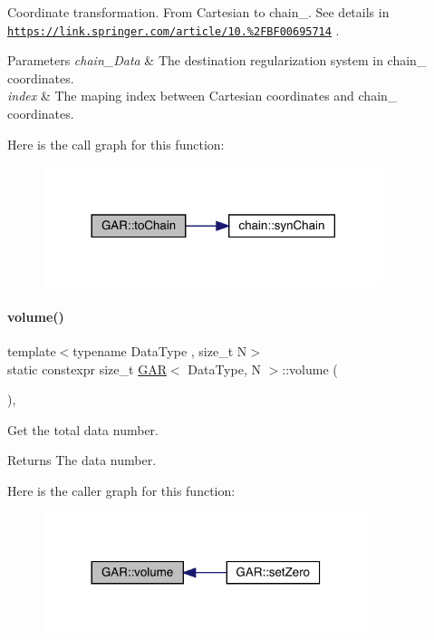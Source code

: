 Coordinate transformation. From Cartesian to chain_. See details in \href{https://link.springer.com/article/10.1007%2FBF00695714}{\tt https\+://link.\+springer.\+com/article/10.\%2\+F\+B\+F00695714} .
\begin{DoxyParams}{Parameters}
{\em chain_\+Data} & The destination regularization system in chain_ coordinates. \\
\hline
{\em index} & The maping index between Cartesian coordinates and chain_ coordinates. \\
\hline
\end{DoxyParams}
Here is the call graph for this function\+:\nopagebreak
\begin{figure}[H]
\begin{center}
\leavevmode
\includegraphics[width=281pt]{class_g_a_r_a18041ac48dc47e6ada3e8a33893b1200_cgraph}
\end{center}
\end{figure}
\mbox{\label{class_g_a_r_abdbcc31db058125bd2ee207e7648b20b}} 
\paragraph{\texorpdfstring{volume()}{volume()}}
{\footnotesize\ttfamily template$<$typename Data\+Type , size\+\_\+t N$>$ \\
static constexpr size\+\_\+t \mbox{\hyperlink{class_g_a_r}{G\+AR}}$<$ Data\+Type, N $>$\+::volume (\begin{DoxyParamCaption}{ }\end{DoxyParamCaption})\hspace{0.3cm}{\ttfamily [inline]}, {\ttfamily [static]}}



Get the total data number. 

\begin{DoxyReturn}{Returns}
The data number. 
\end{DoxyReturn}
Here is the caller graph for this function\+:\nopagebreak
\begin{figure}[H]
\begin{center}
\leavevmode
\includegraphics[width=269pt]{class_g_a_r_abdbcc31db058125bd2ee207e7648b20b_icgraph}
\end{center}
\end{figure}


